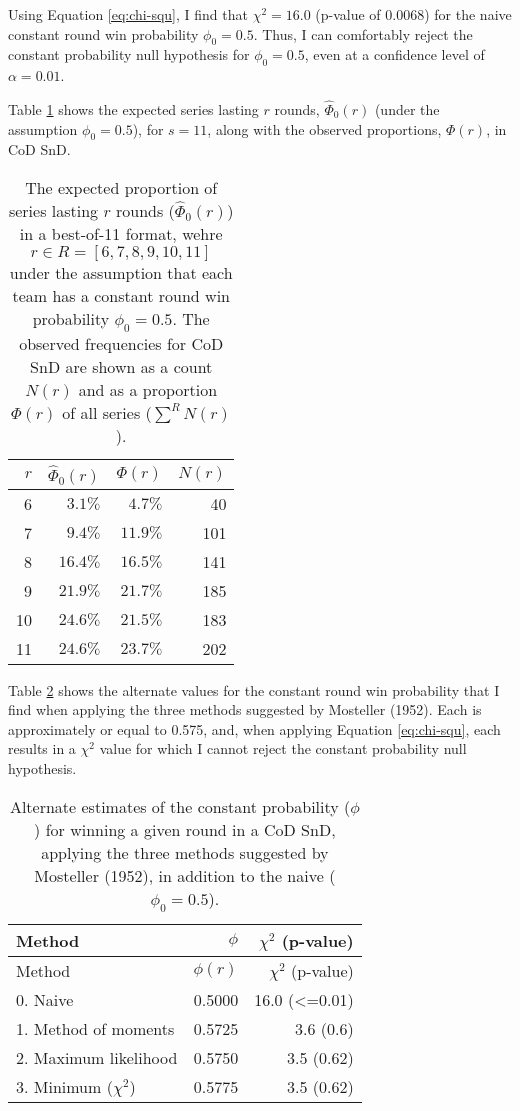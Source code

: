 \documentclass{article}
\begin{document}
Using Equation \ref{eq:chi-squ}, I find that \(\chi^2 = 16.0\) (p-value
of 0.0068) for the naive constant round win probability
\(\phi_0 = 0.5\). Thus, I can comfortably reject the constant
probability null hypothesis for \(\phi_0 = 0.5\), even at a confidence
level of \(\alpha = 0.01\).

Table \ref{tbl:cod-prob-series-lasting-r-rounds} shows the expected
series lasting \(r\) rounds, \(\hat{\Phi}_0(r)\) (under the assumption
\(\phi_0 = 0.5\)), for \(s = 11\), along with the observed proportions,
\(\Phi(r)\), in CoD SnD.

\begin{longtable}{rrrr}
\caption{The expected proportion of series lasting $r$ rounds ($\hat{\Phi}_0(r)$) in a best-of-11 format, wehre $r \in R = [6, 7, 8, 9, 10, 11]$ under the assumption that each team has a constant round win probability $\phi_0 = 0.5$. The observed frequencies for CoD SnD are shown as a count $N(r)$ and as a proportion $\Phi(r)$ of all series ($\sum^R N(r)$).}\label{tbl:cod-prob-series-lasting-r-rounds} \\
\toprule
$r$ & $\hat{\Phi}_0(r)$ & $\Phi(r)$ & $N(r)$ \\ 
\midrule
6 & $3.1\%$ & $4.7\%$ & 40 \\ 
7 & $9.4\%$ & $11.9\%$ & 101 \\ 
8 & $16.4\%$ & $16.5\%$ & 141 \\ 
9 & $21.9\%$ & $21.7\%$ & 185 \\ 
10 & $24.6\%$ & $21.5\%$ & 183 \\ 
11 & $24.6\%$ & $23.7\%$ & 202 \\ 
\bottomrule
\end{longtable}

Table \ref{tbl:mosteller-methods-results} shows the alternate values for
the constant round win probability that I find when applying the three
methods suggested by Mosteller (1952). Each is approximately or equal to
0.575, and, when applying Equation \ref{eq:chi-squ}, each results in a
\(\chi^2\) value for which I cannot reject the constant probability null
hypothesis.

\begin{longtable}[]{@{}lrr@{}}
\caption{Alternate estimates of the constant probability ($\phi$) for winning a given round in a CoD SnD, applying the three methods suggested by Mosteller (1952), in addition to the naive ($\phi_0 = 0.5$).}\label{tbl:mosteller-methods-results} \\
\toprule()
Method & $\phi$ & $\chi^2$ (p-value) \\
\midrule()
\endfirsthead
\toprule()
Method & $\phi(r)$ & $\chi^2$ (p-value) \\
\midrule()
\endhead
0. Naive & 0.5000 & 16.0 (\textless=0.01) \\
1. Method of moments & 0.5725 & 3.6 (0.6) \\
2. Maximum likelihood & 0.5750 & 3.5 (0.62) \\
3. Minimum ($\chi^2$) & 0.5775 & 3.5 (0.62) \\
\bottomrule()
\end{longtable}
\end{document}
